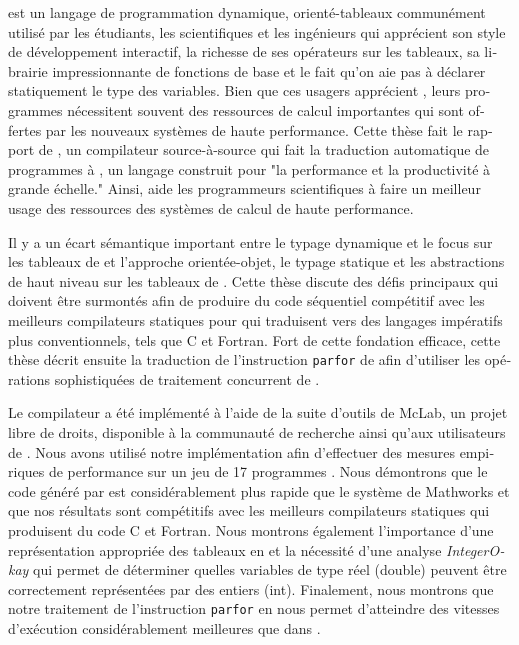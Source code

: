 \begin{otherlanguage}{french} 
\matlab est un langage de programmation dynamique, orienté-tableaux
communément utilisé par les étudiants, les scientifiques et les
ingénieurs qui apprécient son style de développement interactif, la
richesse de ses opérateurs sur les tableaux, sa librairie
impressionnante de fonctions de base et le fait qu'on aie pas à
déclarer statiquement le type des variables.  Bien que ces usagers
apprécient \matlab, leurs programmes nécessitent souvent des ressources
de calcul importantes qui sont offertes par les nouveaux systèmes de
haute performance.  Cette thèse fait le rapport de \mixten, un
compilateur source-à-source qui fait la traduction automatique de
programmes \matlab à \xten, un langage construit pour "la performance et
la productivité à grande échelle."  Ainsi, \mixten aide les programmeurs
scientifiques à faire un meilleur usage des ressources des systèmes de
calcul de haute performance.

Il y a un écart sémantique important entre le typage dynamique et le
focus sur les tableaux de \matlab et l'approche orientée-objet, le
typage statique et les abstractions de haut niveau sur les tableaux de
\xten.  Cette thèse discute des défis principaux qui doivent être
surmontés afin de produire du code \xten séquentiel compétitif avec les
meilleurs compilateurs statiques pour \matlab qui traduisent vers des
langages impératifs plus conventionnels, tels que C et Fortran.  Fort
de cette fondation efficace, cette thèse décrit ensuite la traduction
de l'instruction \texttt{parfor} de \matlab afin d'utiliser les opérations
sophistiquées de traitement concurrent de \xten.

Le compilateur \mixten a été implémenté à l'aide de la suite d'outils de
McLab, un projet libre de droits, disponible à la communauté de
recherche ainsi qu'aux utilisateurs de \matlab.  Nous avons utilisé
notre implémentation afin d'effectuer des mesures empiriques de
performance sur un jeu de 17 programmes \matlab.  Nous démontrons que
le code généré par \mixten est considérablement plus rapide que le
système \matlab de Mathworks et que nos résultats sont compétitifs avec
les meilleurs compilateurs statiques qui produisent du code C et
Fortran.  Nous montrons également l'importance d'une représentation
appropriée des tableaux en \xten et la nécessité d'une analyse
\emph{IntegerOkay} qui permet de déterminer quelles variables de type réel
(double) peuvent être correctement représentées par des entiers
(int). Finalement, nous montrons que notre traitement de l'instruction
\texttt{parfor} en \xten nous permet d'atteindre des vitesses d'exécution
considérablement meilleures que dans \matlab.

\end{otherlanguage}

